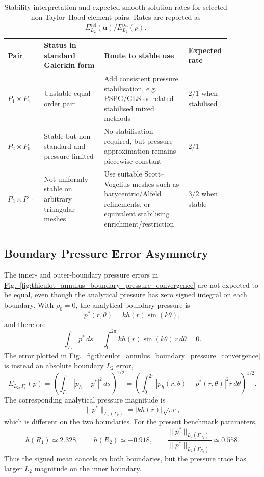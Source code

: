 \documentclass[gmd, manuscript]{copernicus}
\newcommand{\figref}[1]{\hyperref[#1]{Fig.~\ref*{#1}}}
\begin{document}
\begin{table}[H]
\centering
\caption{Stability interpretation and expected smooth-solution rates for selected
non-Taylor--Hood element pairs. Rates are reported as
\(E_{L_2}^{\mathrm{rel}}(\mathbf{u})/E_{L_2}^{\mathrm{rel}}(p)\).}
\label{tab:nonstandard_element_stability}
\scriptsize
\begin{tabular}{p{0.14\linewidth}p{0.25\linewidth}p{0.35\linewidth}p{0.13\linewidth}}
\toprule
Pair & Status in standard Galerkin form & Route to stable use & Expected rate \\
\midrule
\(P_1\times P_1\) & Unstable equal-order pair & Add consistent pressure stabilisation, e.g. PSPG/GLS or related stabilised mixed methods & \(2/1\) when stabilised \\
\(P_2\times P_0\) & Stable but non-standard and pressure-limited & No stabilisation required, but pressure approximation remains piecewise constant & \(2/1\) \\
\(P_2\times P_{-1}\) & Not uniformly stable on arbitrary triangular meshes & Use suitable Scott--Vogelius meshes such as barycentric/Alfeld refinements, or equivalent stabilising enrichment/restriction & \(3/2\) when stable \\
\bottomrule
\end{tabular}
\end{table}

\subsection{Boundary Pressure Error Asymmetry}

The inner- and outer-boundary pressure errors in
\figref{fig:thieulot_annulus_boundary_pressure_convergence} are not expected to
be equal, even though the analytical pressure has zero signed integral on each
boundary. With \(\rho_0=0\), the analytical boundary pressure is
\begin{equation}
  p^*(r,\theta) = k h(r)\sin(k\theta),
\end{equation}
and therefore
\begin{equation}
  \int_{\Gamma_r} p^*\,ds
  =
  \int_0^{2\pi} k h(r)\sin(k\theta)\,r\,d\theta
  =
  0.
\end{equation}
The error plotted in \figref{fig:thieulot_annulus_boundary_pressure_convergence}
is instead an absolute boundary \(L_2\) error,
\begin{equation}
  E_{L_2,\Gamma_r}(p)
  =
  \left(
  \int_{\Gamma_r} |p_h-p^*|^2\,ds
  \right)^{1/2}
  =
  \left(
  \int_0^{2\pi} |p_h(r,\theta)-p^*(r,\theta)|^2 r\,d\theta
  \right)^{1/2}.
\end{equation}
The corresponding analytical pressure magnitude is
\begin{equation}
  \|p^*\|_{L_2(\Gamma_r)}
  =
  |k h(r)|\sqrt{\pi r},
\end{equation}
which is different on the two boundaries. For the present benchmark parameters,
\[
  h(R_1) \simeq 2.328,
  \qquad
  h(R_2) \simeq -0.918,
  \qquad
  \frac{\|p^*\|_{L_2(\Gamma_{R_2})}}
       {\|p^*\|_{L_2(\Gamma_{R_1})}}
  \simeq 0.558 .
\]
Thus the signed mean cancels on both boundaries, but the pressure trace has
larger \(L_2\) magnitude on the inner boundary.
\end{document}
